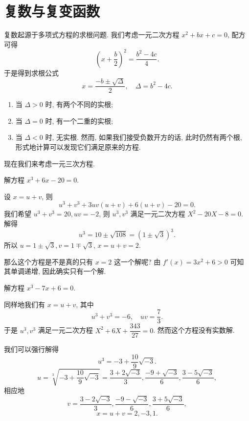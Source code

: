 
\chapter{复数与复变函数}

复数起源于多项式方程的求根问题. 
我们考虑一元二次方程 $x^2+bx+c=0$, 配方可得
  \[\left(x+\frac b2\right)^2=\frac{b^2-4c}4.\]
于是得到求根公式
  \[x=\frac{-b\pm\sqrt\Delta}2,\quad \Delta=b^2-4c.\]
\begin{enumerate}
  \item 当 $\Delta>0$ 时, 有两个不同的实根;
  \item 当 $\Delta=0$ 时, 有一个二重的实根;
  \item 当 $\Delta<0$ 时, 无实根. 然而, 如果我们\alert{接受负数开方}的话, 此时仍然有两个根, 形式地计算可以发现它们满足原来的方程.
\end{enumerate}

现在我们来考虑一元三次方程.
\begin{example}
  解方程 $x^3+6x-20=0$.
\end{example}
\begin{solution}
  设 $x=u+v$, 则
    \[u^3+v^3+3uv(u+v)+6(u+v)-20=0.\]
  {%
    我们希望 $u^3+v^3=20, uv=-2$,%
    则 $u^3,v^3$ 满足一元二次方程 $X^2-20X-8=0$.%
    解得
    \[u^3=10\pm\sqrt{108}{=(1\pm\sqrt3)^3.}\]%
    所以 $u=1\pm\sqrt3, v=1\mp\sqrt 3$,%
    $x=u+v=2$.
  }
\end{solution}

那么这个方程是不是真的只有 $x=2$ 这一个解呢?
由 $f'(x)=3x^2+6>0$ 可知其单调递增, 因此确实只有一个解.
\begin{center}
\end{center}

\begin{example}
  解方程 $x^3-7x+6=0$.
\end{example}

\begin{solution}
  同样地我们有 $x=u+v$, 其中
  \[u^3+v^3=-6,\quad uv=\frac73.\]
  于是 $u^3,v^3$ 满足一元二次方程 $X^2+6X+\dfrac{343}{27}=0$.
  然而这个方程没有实数解.

  我们可以强行解得
  \[u^3=-3+\frac{10}9\sqrt{-3}.\]
  \[u=\sqrt[3]{-3+\frac{10}9\sqrt{-3}}
  =\frac{3+2\sqrt{-3}}3,\frac{-9+\sqrt{-3}}6,\frac{3-5\sqrt{-3}}6,\]
  相应地
  \[v=\frac{3-2\sqrt{-3}}3,\frac{-9-\sqrt{-3}}6,\frac{3+5\sqrt{-3}}6,\]
  \[x=u+v=2,-3,1.\]
\end{solution}

